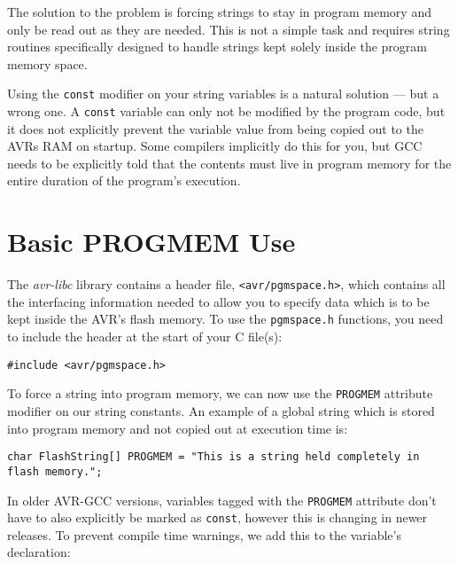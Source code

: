 \documentclass[a4paper,oneside,notitlepage]{book}
\begin{document}
The solution to the problem is forcing strings to stay in program memory and only be read out as they are needed. This is not a simple task and requires string routines specifically designed to handle strings kept solely inside the program memory space.

Using the \lstinline{const} modifier on your string variables is a natural solution --- but a wrong one. A \lstinline{const} variable can only not be modified by the program code, but it does not explicitly prevent the variable value from being copied out to the AVRs RAM on startup. Some compilers implicitly do this for you, but GCC needs to be explicitly told that the contents must live in program memory for the entire duration of the program's execution.


\chapter{Basic PROGMEM Use}
\label{chp:pgmspace}

The \textit{avr-libc} library contains a header file, \lstinline{<avr/pgmspace.h>}, which contains all the interfacing information needed to allow you to specify data which is to be kept inside the AVR's flash memory. To use the \lstinline{pgmspace.h} functions, you need to include the header at the start of your C file(s):

\begin{center}
\begin{lstlisting}
#include <avr/pgmspace.h>
\end{lstlisting}
\end{center}

To force a string into program memory, we can now use the \lstinline{PROGMEM} attribute modifier on our string constants. An example of a global string which is stored into program memory and not copied out at execution time is:

\begin{center}
\begin{lstlisting}
char FlashString[] PROGMEM = "This is a string held completely in flash memory.";
\end{lstlisting}
\end{center}

In older AVR-GCC versions, variables tagged with the \lstinline{PROGMEM} attribute don't have to also explicitly be marked as \lstinline{const}, however this is changing in newer releases. To prevent compile time warnings, we add this to the variable's declaration:
\end{document}
